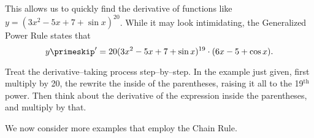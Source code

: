 
This allows us to quickly find the derivative of functions like $y = (3x^2-5x+7+\sin x)^{20}$. While it may look intimidating, the Generalized Power Rule states that 
\[
y\primeskip' = 20(3x^2-5x+7+\sin x)^{19}\cdot (6x-5+\cos x).
\]

Treat the derivative--taking process step--by--step. In the example just given, first multiply by 20, the rewrite the inside of the parentheses, raising it all to the 19$^{\text{th}}$ power. Then think about the derivative of the expression inside the parentheses, and multiply by that.

%

We now consider more examples that employ the Chain Rule.\\

